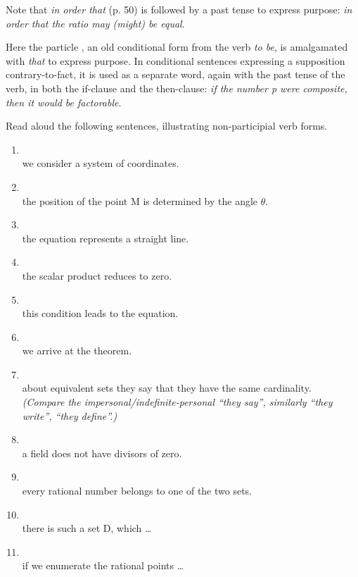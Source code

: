 Note that  \emph{in order that} (p. 50) is followed by a past tense to express purpose:  \emph{in order that the ratio may (might) be equal}.

Here the particle , an old conditional form from the verb  \emph{to be}, is amalgamated with  \emph{that} to express purpose. In conditional sentences expressing a supposition contrary-to-fact, it is used as a separate word, again with the past tense of the verb, in both the if-clause and the then-clause:  \emph{if the number p were composite, then it would be factorable}.

\begin{keybox}[Exercise 3.8]
Read aloud the following sentences, illustrating non-participial verb forms.
\end{keybox}

\begin{enumerate}[label=\arabic*)]
\item {}\\
      we consider a system of coordinates.
\item {}\\
      the position of the point M is determined by the angle $\theta$.
\item {}\\
      the equation represents a straight line.
\item {}\\
      the scalar product reduces to zero.
\item {}\\
      this condition leads to the equation.
\item {}\\
      we arrive at the theorem.
\item {}\\
      about equivalent sets they say that they have the same cardinality.\\[-1mm]
      \emph{(Compare the impersonal/indefinite-personal ``they say'', similarly ``they write'', ``they define''.)}
\item {}\\
      a field does not have divisors of zero.
\item {}\\
      every rational number belongs to one of the two sets.
\item {}\\
      there is such a set D, which \ldots
\item {}\\
      if we enumerate the rational points \ldots
\end{enumerate}

